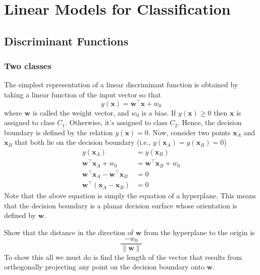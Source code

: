 \documentclass[12pt]{article}
\newcommand{\x}{\mathbf{x}}
\newcommand{\w}{\mathbf{w}}
\newcommand{\xA}{\mathbf{x}_A}
\newcommand{\xB}{\mathbf{x}_B}
\newcommand{\yOfX}{y\left(\x\right)}
\newcommand{\yOfXA}{y\left(\xA\right)}
\newcommand{\yOfXB}{y\left(\xB\right)}
\begin{document}
\section{Linear Models for Classification}
\subsection{Discriminant Functions}
\subsubsection{Two classes}
The simplest representation of a linear discriminant function is obtained by
taking a linear function of the input vector so that
%
\begin{equation*}
  \yOfX = \w^\top\x + w_0
\end{equation*}
%
where $\w$ is called the weight vector, and $w_0$ is a bias. If $\yOfX \geq 0$
then $\x$ is assigned to class $C_1$. Otherwise, it's assigned to class $C_2$.
Hence, the decision boundary is defined by the relation $\yOfX = 0$. Now,
consider two points $\xA$ and $\xB$ that both lie on the decision boundary
(i.e., $\yOfXA = \yOfXB = 0$)
%
\begin{align*}
  \yOfXA &= \yOfXB \\
  \w^\top\xA + w_0 &= \w^\top\xB + w_0 \\
  \w^\top\xA - \w^\top\xB &= 0 \\
  \w^\top\left(\xA - \xB\right) &= 0
\end{align*}
%
Note that the above equation is simply the equation of a hyperplane. This means
that the decision boundary is a planar decision surface whose orientation is
defined by $\w$.

Show that the distance in the direction of $\w$ from the hyperplane to the
origin is
%
\begin{equation*}
  \frac{-w_0}{\|\w\|}
\end{equation*}
%
To show this all we must do is find the length of the vector that results from
orthogonally projecting any point on the decision boundary onto $\w$.
\end{document}
